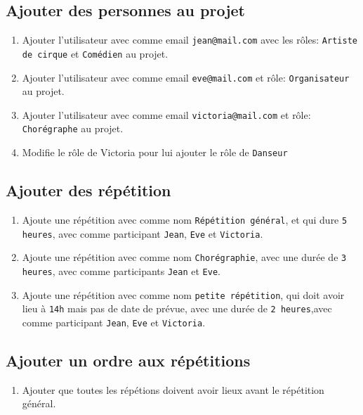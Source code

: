 \documentclass[11pt]{article}
\begin{document}
\subsection{Ajouter des personnes au projet}
\begin{enumerate}
    \item Ajouter l'utilisateur avec comme email \texttt{jean@mail.com} avec les rôles: \texttt{Artiste de cirque} et \texttt{Comédien} au projet.
    \item Ajouter l'utilisateur avec comme email \texttt{eve@mail.com} et rôle: \texttt{Organisateur} au projet.
    \item Ajouter l'utilisateur avec comme email \texttt{victoria@mail.com} et rôle: \texttt{Chorégraphe} au projet. %
    \item Modifie le rôle de Victoria pour lui ajouter le rôle de \texttt{Danseur}
\end{enumerate}
\subsection{Ajouter des répétition}
\begin{enumerate}
    \item Ajoute une répétition avec comme nom \texttt{Répétition général}, et qui dure \texttt{5 heures}, avec comme participant \texttt{Jean}, \texttt{Eve} et \texttt{Victoria}.
    \item Ajoute une répétition avec comme nom \texttt{Chorégraphie}, avec une durée de \texttt{3 heures}, avec comme participants \texttt{Jean} et \texttt{Eve}.
    \item Ajoute une répétition avec comme nom \texttt{petite répétition}, qui doit avoir lieu à \texttt{14h} mais pas de date de prévue, avec une durée de \texttt{2 heures},avec comme participant \texttt{Jean}, \texttt{Eve} et \texttt{Victoria}.
\end{enumerate}
\subsection{Ajouter un ordre aux répétitions}
\begin{enumerate}
    \item Ajouter que toutes les répétions doivent avoir lieux avant le répétition général.
\end{enumerate}
\end{document}
